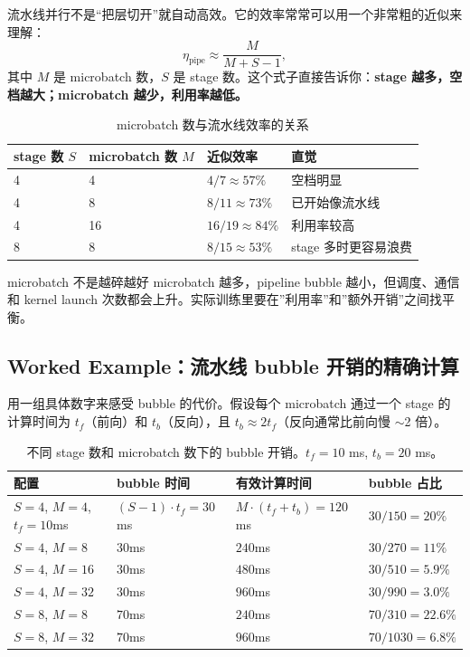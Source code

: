 \documentclass[a4paper]{article}
\begin{document}
流水线并行不是“把层切开”就自动高效。它的效率常常可以用一个非常粗的近似来理解：
\[
\eta_{\text{pipe}} \approx \frac{M}{M + S - 1},
\]
其中 $M$ 是 microbatch 数，$S$ 是 stage 数。这个式子直接告诉你：\textbf{stage 越多，空档越大；microbatch 越少，利用率越低。}

\begin{table}[H]
\centering
\small
\begin{tabular}{p{2.3cm}p{2.5cm}p{3.6cm}p{4cm}}
\toprule
\textbf{stage 数 $S$} & \textbf{microbatch 数 $M$} & \textbf{近似效率} & \textbf{直觉} \\
\midrule
4 & 4 & $4/7 \approx 57\%$ & 空档明显 \\
4 & 8 & $8/11 \approx 73\%$ & 已开始像流水线 \\
4 & 16 & $16/19 \approx 84\%$ & 利用率较高 \\
8 & 8 & $8/15 \approx 53\%$ & stage 多时更容易浪费 \\
\bottomrule
\end{tabular}
\caption{microbatch 数与流水线效率的关系}
\end{table}

\begin{warningbox}{microbatch 不是越碎越好}
microbatch 越多，pipeline bubble 越小，但调度、通信和 kernel launch 次数都会上升。实际训练里要在”利用率”和”额外开销”之间找平衡。
\end{warningbox}

\subsection{Worked Example：流水线 bubble 开销的精确计算}

用一组具体数字来感受 bubble 的代价。假设每个 microbatch 通过一个 stage 的计算时间为 $t_f$（前向）和 $t_b$（反向），且 $t_b \approx 2 t_f$（反向通常比前向慢 $\sim$2 倍）。

\begin{table}[H]
\centering
\small
\begin{tabular}{p{3.8cm}p{2.5cm}p{2.5cm}p{3.5cm}}
\toprule
\textbf{配置} & \textbf{bubble 时间} & \textbf{有效计算时间} & \textbf{bubble 占比} \\
\midrule
$S=4$, $M=4$, $t_f=10$ms & $(S-1) \cdot t_f = 30$ms & $M \cdot (t_f + t_b) = 120$ms & $30/150 = 20\%$ \\
$S=4$, $M=8$ & $30$ms & $240$ms & $30/270 = 11\%$ \\
$S=4$, $M=16$ & $30$ms & $480$ms & $30/510 = 5.9\%$ \\
$S=4$, $M=32$ & $30$ms & $960$ms & $30/990 = 3.0\%$ \\
$S=8$, $M=8$ & $70$ms & $240$ms & $70/310 = 22.6\%$ \\
$S=8$, $M=32$ & $70$ms & $960$ms & $70/1030 = 6.8\%$ \\
\bottomrule
\end{tabular}
\caption{不同 stage 数和 microbatch 数下的 bubble 开销。$t_f = 10$ ms, $t_b = 20$ ms。}
\end{table}
\end{document}
